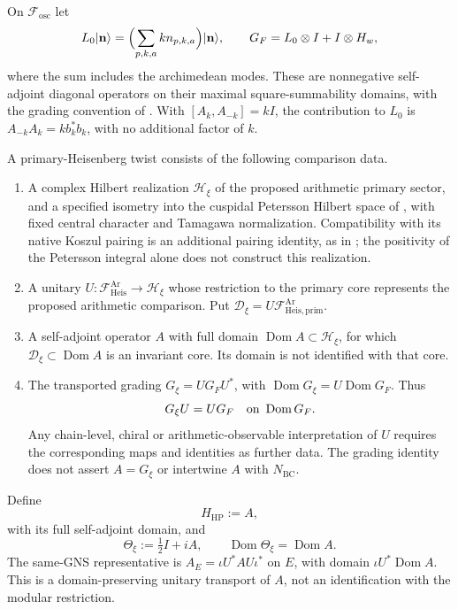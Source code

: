 \begin{definition}
\label{v4-arith:w5-b:def:twist}
On $\mathcal F_{\mathrm{osc}}$ let
\[
 L_0|\mathbf n\rangle=\Bigl(\sum_{p,k,a}k n_{p,k,a}\Bigr)|\mathbf n\rangle,
 \qquad G_F=L_0\otimes I+I\otimes H_w,
\]
where the sum includes the archimedean modes. These are nonnegative
self-adjoint diagonal operators on their maximal square-summability
domains, with the grading convention of
. With $[A_k,A_{-k}]=kI$, the contribution to $L_0$ is
$A_{-k}A_k=k b_k^*b_k$, with no additional factor of $k$.

A primary-Heisenberg twist consists of the following comparison data.
\begin{enumerate}
\item A complex Hilbert realization $\mathcal H_\xi$ of the proposed
arithmetic primary sector, and a specified isometry into the
cuspidal Petersson Hilbert space of
, with fixed central character and
Tamagawa normalization. Compatibility with its native Koszul pairing
is an additional pairing identity, as in
; the positivity of the
Petersson integral alone does not construct this realization.
\item A unitary $U:\mathcal F^{\mathrm{Ar}}_{\mathrm{Heis}}\to\mathcal H_\xi$
whose restriction to the primary core represents the proposed
arithmetic comparison. Put $\mathcal D_\xi=U\mathcal F^{\mathrm{Ar}}_{\mathrm{Heis},\mathrm{prim}}$.
\item A self-adjoint operator $A$ with full domain
$\operatorname{Dom}A\subset\mathcal H_\xi$, for which
$\mathcal D_\xi\subset\operatorname{Dom}A$ is an invariant core.
Its domain is not identified with that core.
\item The transported grading $G_\xi=UG_FU^*$, with
$\operatorname{Dom}G_\xi=U\operatorname{Dom}G_F$. Thus
\begin{equation}
\label{v4-arith:w5-b:eq:twist-intertwine}
 G_\xi U=UG_F\quad\hbox{on }\operatorname{Dom}G_F.
\end{equation}
Any chain-level, chiral or arithmetic-observable interpretation of
$U$ requires the corresponding maps and identities as further data.
The grading identity does not assert $A=G_\xi$ or intertwine $A$
with $N_{\mathrm{BC}}$.
\end{enumerate}
Define
\begin{equation}
\label{v4-arith:w5-b:eq:H-HP-def}
 H_{\mathrm{HP}}:=A,
\end{equation}
with its full self-adjoint domain, and
\begin{equation}
\label{v4-arith:w5-b:eq:Theta-xi-def}
 \Theta_\xi:=\tfrac12I+iA,\qquad
 \operatorname{Dom}\Theta_\xi=\operatorname{Dom}A.
\end{equation}
The same-GNS representative is
$A_E=\iota U^*AU\iota^*$ on $E$, with domain
$\iota U^*\operatorname{Dom}A$. This is a domain-preserving unitary
transport of $A$, not an identification with the modular restriction.
\end{definition}

